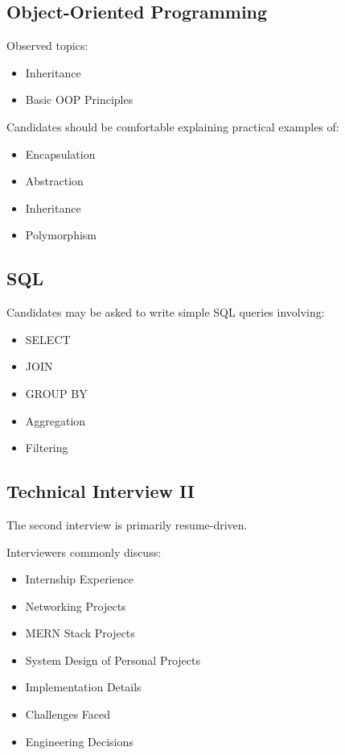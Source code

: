 \documentclass[11pt,a4paper]{article}
\begin{document}

\subsection{Object-Oriented Programming}

Observed topics:

\begin{itemize}
	\item Inheritance
	\item Basic OOP Principles
\end{itemize}

Candidates should be comfortable explaining practical examples of:

\begin{itemize}
	\item Encapsulation
	\item Abstraction
	\item Inheritance
	\item Polymorphism
\end{itemize}


\subsection{SQL}

Candidates may be asked to write simple SQL queries involving:

\begin{itemize}
	\item SELECT
	\item JOIN
	\item GROUP BY
	\item Aggregation
	\item Filtering
\end{itemize}


\subsection{Technical Interview II}

The second interview is primarily resume-driven.

Interviewers commonly discuss:

\begin{itemize}
	\item Internship Experience
	\item Networking Projects
	\item MERN Stack Projects
	\item System Design of Personal Projects
	\item Implementation Details
	\item Challenges Faced
	\item Engineering Decisions
\end{itemize}
\end{document}
